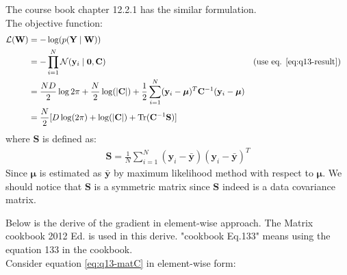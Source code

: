 \documentclass[12pt]{article}
\newenvironment{question}[2][Question]{\begin{trivlist}
\kern10pt
\item[\hskip \labelsep {\bfseries #1}\hskip \labelsep {\bfseries #2.}]}{\end{trivlist}}
\begin{document}
\begin{question}{15}
The course book chapter 12.2.1 has the similar formulation.\\
The objective function:
\begin{align*}
  \mathcal{L}(\mathbf{W}) &= -\log(p(\mathbf{Y}\mid\mathbf{W})) \\
  &= -\prod_{i=1}^{N} \mathcal{N}(\mathbf{y}_i\mid\mathbf{0}, \mathbf{C})
      && \text{(use eq. \eqref{eq:q13-result})} \\
  &= \frac{ND}{2}\log{2\pi} + \frac{N}{2}\log(|\mathbf{C}|) 
     + \frac{1}{2} \sum_{i=1}^{N} (\mathbf{y}_i - \bm{\mu})^T \mathbf{C}^{-1}(\mathbf{y}_i - \bm{\mu}) \\
  &= \frac{N}{2}[D\log(2\pi) + \log(|\mathbf{C}|) + \text{Tr}(\mathbf{C}^{-1}\mathbf{S})]
\end{align*}
where $\mathbf{S}$ is defined as:
\begin{align*}
  \mathbf{S} = \frac{1}{N}\sum_{i=1}^{N} (\mathbf{y}_i - \bar{\mathbf{y}})(\mathbf{y}_i - \bar{\mathbf{y}})^T
\end{align*}
Since $\bm{\mu}$ is estimated as $\bar{\mathbf{y}}$ by maximum likelihood method with respect to $\bm{\mu}$.
We should notice that $\mathbf{S}$ is a symmetric matrix since $\mathbf{S}$ indeed is a data covariance matrix.

Below is the derive of the gradient in element-wise approach. The Matrix cookbook 2012 Ed.
is used in this derive. "cookbook Eq.133" means using the equation 133 in the cookbook.\\
Consider equation \eqref{eq:q13-matC} in element-wise form:


\end{question}
\end{document}
